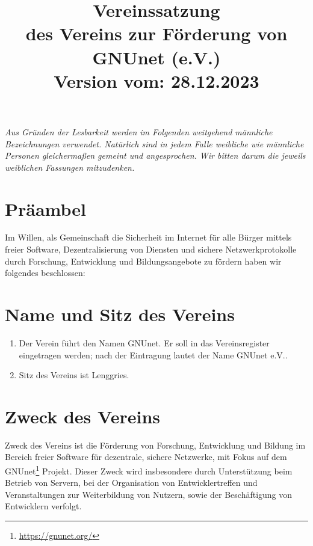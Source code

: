 \documentclass[german,a4paper]{article} %
\title{Vereinssatzung\\des Vereins zur F\"orderung von GNUnet (e.V.)\\\small{Version vom: 28.12.2023}}
\date{}
\newenvironment{enumpar}{%
  \renewcommand{\labelenumi}{\theenumi}%
  \renewcommand{\theenumi}{(\arabic{enumi})}%
  \renewcommand{\labelenumii}{\theenumii}%
  \renewcommand{\theenumii}{(\alph{enumii})}%
  \begin{enumerate}}
{\end{enumerate}}
\begin{document}
\maketitle \textit{\small{Aus Gründen der Lesbarkeit werden im
    Folgenden weitgehend männliche Bezeichnungen verwendet. Natürlich
    sind in jedem Falle weibliche wie männliche Personen gleichermaßen
    gemeint und angesprochen. Wir bitten darum die jeweils weiblichen
    Fassungen mitzudenken.}}

\section*{Präambel}
Im Willen, als Gemeinschaft die Sicherheit im Internet f\"ur alle
B\"urger mittels freier Software, Dezentralisierung von Diensten und
sichere Netzwerkprotokolle durch Forschung, Entwicklung und
Bildungsangebote zu f\"ordern haben wir folgendes beschlossen: \par

\section{Name und Sitz des Vereins}
\begin{enumpar}

\item Der Verein führt den Namen \glqq GNUnet\grqq . Er soll in das Vereinsregister eingetragen werden; nach der Eintragung lautet der Name \glqq GNUnet e.V.\grqq.
\item Sitz des Vereins ist Lenggries.
\end{enumpar}

\section{Zweck des Vereins}

Zweck des Vereins ist die F\"orderung von Forschung, Entwicklung und
Bildung im Bereich freier Software f\"ur dezentrale, sichere Netzwerke,
mit Fokus auf dem GNUnet\footnote{\url{https://gnunet.org/}} Projekt.  Dieser
Zweck wird insbesondere durch Unterst\"utzung beim Betrieb
von Servern, bei der Organisation von Entwicklertreffen und
Veranstaltungen zur Weiterbildung von Nutzern, sowie der
Besch\"aftigung von Entwicklern verfolgt.
\end{document}
